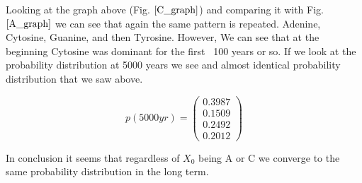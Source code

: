 \documentclass[letter,12pt]{article}
\begin{document}
\begin{enumerate}
    Looking at the graph above (Fig. $\ref{C_graph}$) and comparing it with Fig. $\ref{A_graph}$ we can see that again the same pattern is repeated. Adenine, Cytosine,
    Guanine, and then Tyrosine. However, We can see that at the beginning Cytosine was dominant for the first ~100 years or so.
    If we look at the probability distribution at 5000 years we see and almost identical probability distribution that we saw above.

    \begin{equation}
      p(5000 yr) = 
      \begin{pmatrix}
        0.3987 \\
        0.1509 \\
        0.2492 \\
        0.2012
      \end{pmatrix}
    \end{equation}

    In conclusion it seems that regardless of $X_0$ being A or C we converge to the same probability
    distribution in the long term.

  
\end{enumerate}

\end{document}
